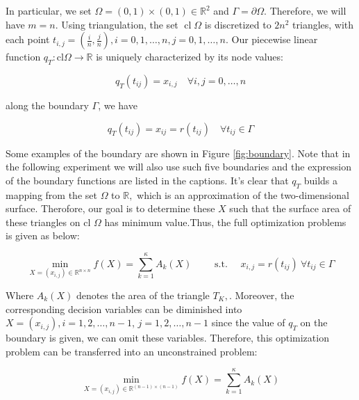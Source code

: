 In particular, we set $\Omega=(0,1) \times(0,1) \in \mathbb R^{2}$ and $\Gamma=\partial \Omega$. Therefore, we will have $m=n$. Using triangulation, the set $\operatorname{cl} \Omega$ is discretized to $2 n^{2}$ triangles, with each point $t_{i, j}=\left(\frac{i}{n}, \frac{j}{n}\right), i=0,1, \ldots, n, j=0,1, \ldots, n .$ Our piecewise linear function $q_{T}: \mathrm{cl} \Omega \rightarrow \mathbb{R}$ is uniquely characterized by its node values:

\begin{equation}
    q_{T}\left(t_{i j}\right)=x_{i, j} \quad \forall i, j=0, \ldots, n
\end{equation}

along the boundary $\Gamma$, we have 

\begin{equation}
q_{T}\left(t_{i j}\right)=x_{i j}=r\left(t_{i j}\right) \quad \forall t_{i j} \in \Gamma
\end{equation}

Some examples of the boundary are shown in Figure \ref{fig:boundary}. Note that in the following experiment we will also use such five boundaries and the expression of the boundary functions are listed in the captions. It's clear that $q_{T}$ builds a mapping from the set $\Omega$ to $\mathbb{R},$ which is an approximation of the two-dimensional surface.
Therofore, our goal is to determine these $X$ such that the surface area of these triangles on cl $\Omega$ has minimum value.Thus, the full optimization problems is given as below:

\begin{equation}
\min _{X=\left(x_{i, j}\right) \in \mathbb{R}^{n \times n}} f(X)=\sum_{k=1}^{\kappa} A_{k}(X) \qquad \text { s.t. } \quad x_{i, j}=r\left(t_{i j}\right) \ \forall t_{i j} \in \Gamma
\end{equation}

Where $A_{k}(X)$ denotes the area of the triangle $T_{K},$. Moreover, the corresponding decision variables can be diminished into $X=\left(x_{i, j}\right), i=1,2, \ldots, n-1$, $j=1,2, \ldots, n-1$
since the value of $q_{T}$ on the boundary is given, we can omit these variables. Therefore, this optimization problem can be transferred into an unconstrained problem:

\begin{equation}
\min _{X=\left(x_{i, j}\right) \in \mathbb{R}^{(n-1) \times(n-1)}} f(X)=\sum_{k=1}^{\kappa} A_{k}(X)
\end{equation}

